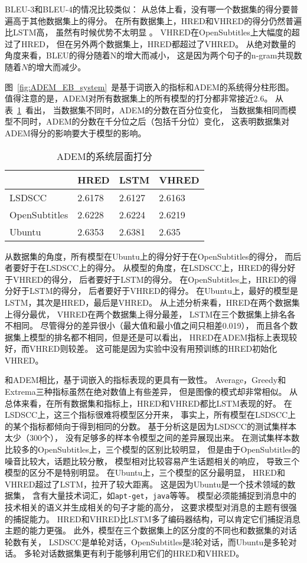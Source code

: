 BLEU-3和BLEU-4的情况比较类似： 从总体上看，没有哪一个数据集的得分要普遍高于其他数据集上的得分。 在所有数据集上，HRED和VHRED的得分仍然普遍比LSTM高， 虽然有时候优势不太明显 。 VHRED在OpenSubtitles上大幅度的超过了HRED， 但在另外两个数据集上，HRED都超过了VHRED。 从绝对数量的角度来看，BLEU的得分随着N的增大而减小， 这是因为两个句子的n-gram共现数随着$N$的增大而减少。


图~\ref{fig:ADEM_EB_system}~是基于词嵌入的指标和ADEM的系统得分柱形图。 值得注意的是，ADEM对所有数据集上的所有模型的打分都非常接近2.6。 从表~\ref{tab:ADEM_system}~看出， 当数据集不同时，ADEM的分数在百分位变化， 当数据集相同而模型不同时，ADEM的分数在千分位之后（包括千分位）变化， 这表明数据集对ADEM得分的影响要大于模型的影响。
\begin{table}
    \centering
    \caption{ADEM的系统层面打分}
    \label{tab:ADEM_system}
    \begin{tabular}{llll}
        \toprule
        & HRED & LSTM & VHRED \\
        \midrule
        LSDSCC & 2.6178 & 2.6127 & 2.6163  \\
        OpenSubtitles & 2.6228 & 2.6224 & 2.6219 \\
        Ubuntu & 2.6353 & 2.6381 & 2.635 \\
        \bottomrule
    \end{tabular}
\end{table}
从数据集的角度，所有模型在Ubuntu上的得分好于在OpenSubtitles的得分， 而后者要好于在LSDSCC上的得分。 从模型的角度，在LSDSCC上，HRED的得分好于VHRED的得分， 后者要好于LSTM的得分。 在OpenSubtitles上，HRED的得分好于LSTM的得分， 后者要好于VHRED的得分。 在Ubuntu上，最好的模型是LSTM，其次是HRED，最后是VHRED。 从上述分析来看，HRED在两个数据集上得分最优， VHRED在两个数据集上得分最差， LSTM在三个数据集上排名各不相同。 尽管得分的差异很小（最大值和最小值之间只相差0.019）， 而且各个数据集上模型的排名都不相同，但是还是可以看出， HRED在ADEM指标上表现较好，而VHRED则较差。 这可能是因为实验中没有用预训练的HRED初始化VHRED。


和ADEM相比，基于词嵌入的指标表现的更具有一致性。 Average，Greedy和Extrema三种指标虽然在绝对数值上有些差异， 但是图像的模式却非常相似。 从总体来看，在所有数据集和指标上，HRED和VHRED都比LSTM表现的好。 在LSDSCC上，这三个指标很难将模型区分开来， 事实上，所有模型在LSDSCC上的某个指标都倾向于得到相同的分数。 基于分析这是因为LSDSCC的测试集样本太少（300个）， 没有足够多的样本令模型之间的差异展现出来。 在测试集样本数比较多的OpenSubtitles上，三个模型的区别比较明显， 但是由于OpenSubtitles的噪音比较大，话题比较分散， 模型相对比较容易产生话题相关的响应， 导致三个模型的区分不是特别明显。 在Ubuntu上，三个模型的区分最明显， HRED和VHRED超过了LSTM，拉开了较大距离。 这是因为Ubuntu是一个技术领域的数据集， 含有大量技术词汇，如\texttt{apt-get}，\texttt{java}等等。 模型必须能捕捉到消息中的技术相关的语义并生成相关的句子才能的高分， 这要求模型对消息的主题有很强的捕捉能力。 HRED和VHRED比LSTM多了编码器结构，可以肯定它们捕捉消息主题的能力更强。 此外，模型在三个数据集上的区分度的不同也和数据集的对话轮数有关， LSDSCC是单轮对话，OpenSubtitles是3轮对话，而Ubuntu是多轮对话。 多轮对话数据集更有利于能够利用它们的HRED和VHRED。


